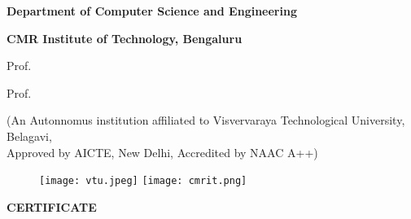 \documentclass{article}
\newlength{\toptafiddle}
\newlength{\bottafiddle}
\begin{document}
\begin{titlingpage}
\thispagestyle{empty}
\setlength{\toptafiddle}{1in}
\setlength{\bottafiddle}{1in}
\vspace*{-0.75in}
\enlargethispage{\toptafiddle}
\begin{center}
\begin{Large}
\textbf{Department of Computer Science and Engineering} \\
\end{Large}
\begin{Large}
\textbf{CMR Institute of Technology, Bengaluru}\\
\item Prof.
\item Prof.
\end{Large}
\begin{small}
(An Autonnomus institution affiliated to Visvervaraya Technological University, Belagavi,\\ Approved by AICTE, New Delhi, Accredited by NAAC A++)
\end{small}
\vspace{0.2cm}
\begin{figure}[h]
	\centering
	\texttt{[image: vtu.jpeg]}
	\hspace{0.1\textwidth}
	\texttt{[image: cmrit.png]}
\end{figure}
\Large\textbf{CERTIFICATE}
\end{center}


\end{titlingpage}
\end{document}
